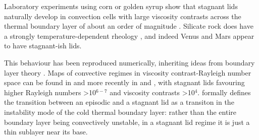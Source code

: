 
Laboratory experiments using corn or golden syrup show that stagnant lids naturally develop in convection cells with large viscosity contrasts across the thermal boundary layer of about an order of magnitude \citet{Davaille1993, Giannandrea1993}. Silicate rock does have a strongly temperature-dependent rheology \citep{Karato1993}, and indeed Venus and Mars appear to have stagnant-ish lids. 

This behaviour has been reproduced numerically, inheriting ideas from boundary layer theory \citep{Solomatov1995, Moresi1995a, Solomatov1996a}. Maps of convective regimes in viscosity contrast-Rayleigh number space can be found in \citet{Solomatov1996a} and more recently in \citet{Huttig2011} and \citet{Miyagoshi2015}, with stagnant lids favouring higher Rayleigh numbers \textgreater 10$^{6-7}$ and viscosity contrasts \textgreater 10$^4$. \citet{Solomatov1995} formally defines the transition between an episodic and a stagnant lid as a transiton in the instability mode of the cold thermal boundary layer: rather than the entire boundary layer being convectively unstable, in a stagnant lid regime it is just a thin sublayer near its base. %



